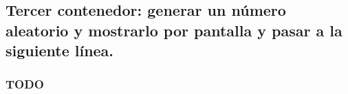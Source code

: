 

\subsection{Tercer contenedor: generar un número aleatorio y mostrarlo por pantalla y pasar a la siguiente línea.}

\subsubsection{TODO}

\begin{listing}[style=consola]
    $ 
\end{listing}